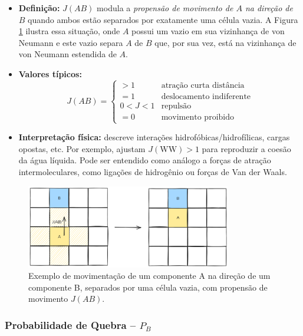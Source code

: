 \documentclass[12pt,oneside]{report}
\begin{document}
\begin{itemize}
    \item \textbf{Definição:} $J(AB)$ modula a
          \emph{propensão de movimento de $A$ na direção de $B$}
          quando ambos estão separados por exatamente uma célula vazia. A Figura \ref{fig:movimentacao_juncao} ilustra essa situação, onde $A$ possui um vazio em sua vizinhança de von Neumann e este vazio separa $A$ de $B$ que, por sua vez, está na vizinhança de von Neumann estendida de $A$.
    \item \textbf{Valores típicos:}
          \[
              J(AB)=
              \begin{cases}
                  >1    & \text{atração curta distância}  \\[2pt]
                  =1    & \text{deslocamento indiferente} \\[2pt]
                  0<J<1 & \text{repulsão}                 \\[2pt]
                  =0    & \text{movimento proibido}
              \end{cases}
          \]
    \item \textbf{Interpretação física:} descreve interações
          hidrofóbicas/hidrofílicas, cargas opostas, etc.
          Por exemplo, \citeauthor{kier2005} ajustam
          $J(\mathrm{WW})>1$ para reproduzir a coesão da água líquida. Pode ser entendido como análogo a forças de atração intermoleculares, como ligações de hidrogênio ou forças de Van der Waals.
\end{itemize}

\begin{figure}[H]
    \centering
    \includegraphics[width=0.8\textwidth]{img/Jab.png}
    \caption{\small Exemplo de movimentação de um componente A na direção de um componente B, separados por uma célula vazia, com propensão de movimento $J(AB)$.}
    \label{fig:movimentacao_juncao}
\end{figure}

\subsubsection{Probabilidade de Quebra – \texorpdfstring{$P_B$}{Pb}}
\label{subsubsec:Pb}
\end{document}
